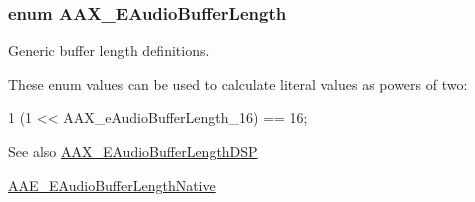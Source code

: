 \subsubsection[{A\+A\+X\+\_\+\+E\+Audio\+Buffer\+Length}]{\setlength{\rightskip}{0pt plus 5cm}enum {\bf A\+A\+X\+\_\+\+E\+Audio\+Buffer\+Length}}\label{a00206_ada5e011bdfdc6a996de752662b3dfbe7}


Generic buffer length definitions. 

These enum values can be used to calculate literal values as powers of two\+:


\begin{DoxyCode}
1 (1 << AAX\_eAudioBufferLength\_16) == 16;
\end{DoxyCode}


\begin{DoxySeeAlso}{See also}
\hyperlink{a00206_ab33e0f1ecf04ca4161fa8d8de5845d67}{A\+A\+X\+\_\+\+E\+Audio\+Buffer\+Length\+D\+S\+P} 

\hyperlink{a00206_aa1769ee466fd07659d8c7ef5ac61cd49}{A\+A\+E\+\_\+\+E\+Audio\+Buffer\+Length\+Native} 
\end{DoxySeeAlso}
